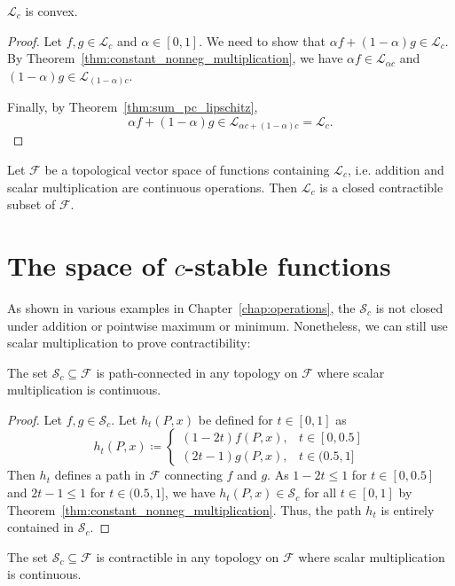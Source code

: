 \begin{theorem}
    $\mathcal{L}_c$ is convex.
\end{theorem}
\begin{proof}
    Let $f, g \in \mathcal{L}_c$ and $\alpha \in [0, 1]$.
    We need to show that $\alpha f + (1 - \alpha) g \in \mathcal{L}_c$.
    By Theorem~\ref{thm:constant_nonneg_multiplication}, we have
    $\alpha f \in \mathcal{L}_{\alpha c}$ and $(1 - \alpha) g \in \mathcal{L}_{(1 - \alpha)c}$.

    Finally, by Theorem~\ref{thm:sum_pc_lipschitz},
    \begin{equation}
        \alpha f + (1 - \alpha) g \in \mathcal{L}_{\alpha c + (1 - \alpha)c} = \mathcal{L}_c.
    \end{equation}
\end{proof}

\begin{corollary}
    Let $\mathcal{F}$ be a topological vector space of functions containing
    $\mathcal{L}_c$, i.e. addition and scalar multiplication are continuous
    operations.
    Then $\mathcal{L}_c$ is a closed contractible subset of $\mathcal{F}$.
\end{corollary}

\section{The space of $c$-stable functions}

As shown in various examples in Chapter~\ref{chap:operations},
the $\mathcal{S}_c$ is not closed under addition or pointwise maximum or
minimum. Nonetheless, we can still use scalar multiplication to prove
contractibility:
\begin{theorem}
    The set $\mathcal{S}_c \subseteq \mathcal{F}$ is path-connected in any
    topology on $\mathcal{F}$ where scalar multiplication is continuous.
\end{theorem}
\begin{proof}
    Let $f, g \in \mathcal{S}_c$.
    Let $h_t(P, x)$ be defined for $t \in [0, 1]$ as
    \begin{equation}
        h_t(P, x) \coloneqq \begin{cases}
            (1 - 2t)f(P, x), & t \in [0, 0.5] \\
            (2t - 1)g(P, x), & t \in (0.5, 1]
        \end{cases}
    \end{equation}
    Then $h_t$ defines a path in $\mathcal{F}$ connecting $f$ and $g$.
    As $1 - 2t \leq 1$ for $t \in [0, 0.5]$ and $2t - 1 \leq 1$ for $t \in (0.5, 1]$,
    we have $h_t(P, x) \in \mathcal{S}_c$ for all $t \in [0, 1]$ by
    Theorem~\ref{thm:constant_nonneg_multiplication}.
    Thus, the path $h_t$ is entirely contained in $\mathcal{S}_c$.
\end{proof}
\begin{corollary}
    The set $\mathcal{S}_c \subseteq \mathcal{F}$ is contractible in any
    topology on $\mathcal{F}$ where scalar multiplication is continuous.
\end{corollary}

